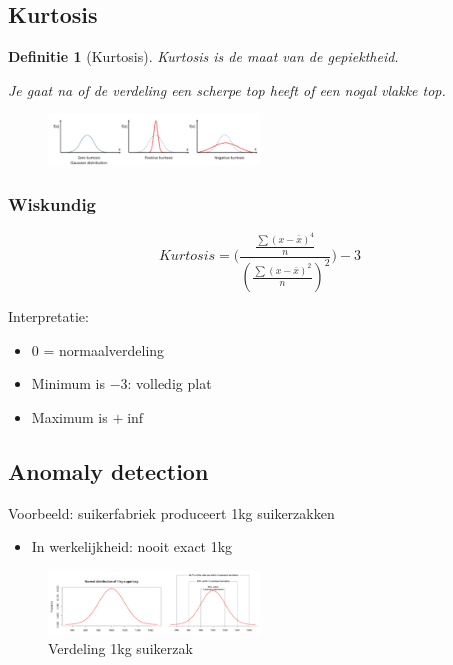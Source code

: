 \documentclass{article}
\newtheorem{theorem}{Definitie}[section]
\begin{document}
\subsection{Kurtosis}

\begin{theorem}[Kurtosis]
    Kurtosis is de maat van de gepiektheid. 

    Je gaat na of de verdeling een scherpe top heeft of een nogal vlakke top.
\end{theorem}

\begin{figure}[H]
    \centering
    \includegraphics[width=0.5\textwidth]{kurtosis.png}
\end{figure}

\subsubsection{Wiskundig}

\begin{equation}
    Kurtosis = \Bigg(\frac{\frac{\sum(x-\bar{x})^4}{n}}{(\frac{\sum(x-\bar{x})^2}{n})^2} \Bigg) -3
\end{equation}



Interpretatie:

\begin{itemize}
    \item $0$ = normaalverdeling
    \item Minimum is $-3$: volledig plat
    \item Maximum is $+\inf$
\end{itemize}


\subsection{Anomaly detection}

Voorbeeld: suikerfabriek produceert 1kg suikerzakken

\begin{itemize}
    \item In werkelijkheid: nooit exact 1kg
\end{itemize}

\begin{figure}[H]
    \centering
    \includegraphics[width=0.5\textwidth]{anomaly-detection.png}
    \caption{Verdeling 1kg suikerzak}
\end{figure}
\end{document}

